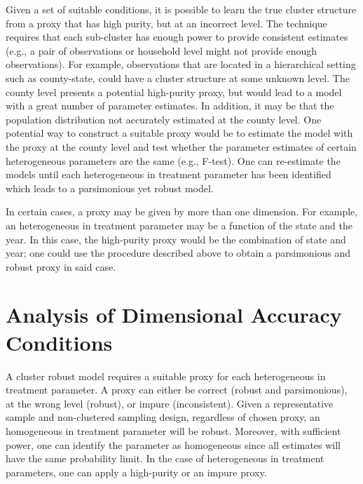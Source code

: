 \documentclass{jbsc}
\begin{document}
Given a set of suitable conditions, it is possible to learn the true cluster structure from a proxy that has high purity, but at an incorrect level. The technique requires that each sub-cluster has enough power to provide consistent estimates (e.g., a pair of observations or household level might not provide enough observations). For example, observations that are located in a hierarchical setting such as county-state, could have a cluster structure at some unknown level. The county level presents a potential high-purity proxy, but would lead to a model with a great number of parameter estimates. In addition, it may be that the population distribution not accurately estimated at the county level. One potential way to construct a suitable proxy would be to estimate the model with the proxy at the county level and test whether the parameter estimates of certain heterogeneous parameters are the same (e.g., F-test). One can re-estimate the models until each heterogeneous in treatment parameter has been identified which leads to a parsimonious yet robust model.

In certain cases, a proxy may be given by more than one dimension. For example, an heterogeneous in treatment parameter may be a function of the state and the year. In this case, the high-purity proxy would be the combination of state and year; one could use the procedure described above to obtain a parsimonious and robust proxy in said case.

\FloatBarrier
\section{Analysis of Dimensional Accuracy Conditions}

A cluster robust model requires a suitable proxy for each heterogeneous in treatment parameter. A proxy can either be correct (robust and parsimonious), at the wrong level (robust), or impure (inconsistent). Given a representative sample and non-clustered sampling design, regardless of chosen proxy, an homogeneous in treatment parameter will be robust. Moreover, with sufficient power, one can identify the parameter as homogeneous since all estimates will have the same probability limit. In the case of heterogeneous in treatment parameters, one can apply a high-purity or an impure proxy.
\end{document}
